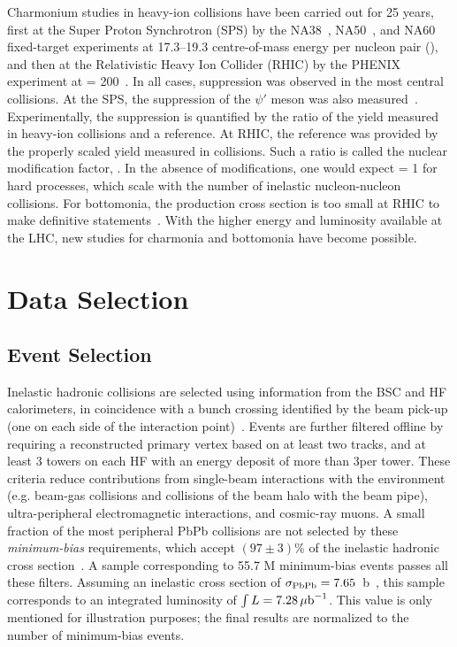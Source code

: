 Charmonium studies in heavy-ion collisions have been carried out for
25 years, first at the Super Proton Synchrotron (SPS) by the
NA38~\cite{Baglin:1994ui},
NA50~\cite{Alessandro:2004ap,Alessandro:2006ju}, and
NA60~\cite{Arnaldi:2007zz} fixed-target experiments at 17.3--19.3\GeV
centre-of-mass energy per nucleon pair (\sqrtsnn), and then at the
Relativistic Heavy Ion Collider (RHIC) by the PHENIX experiment at
\sqrtsnn = 200\GeV~\cite{Adare:2006ns}. In all cases, \Jpsi
suppression was observed in the most central collisions. At the SPS,
the suppression of the $\psi'$ meson was also
measured~\cite{Alessandro:2006ju}. Experimentally, the suppression is
quantified by the ratio of the yield measured in heavy-ion collisions
and a reference. At RHIC, the reference was provided by the properly
scaled yield measured in \pp collisions. Such a ratio is called the
nuclear modification factor, \raa. In the absence of modifications,
one would expect \raa = 1 for hard processes, which scale with the
number of inelastic nucleon-nucleon collisions. For bottomonia, the
production cross section is too small at RHIC to make definitive
statements~\cite{Abelev:2010am}. With the higher energy and luminosity
available at the LHC, new studies for charmonia and bottomonia have
become possible. 

\section{Data Selection}
\label{sec:data-selection}
\subsection{Event Selection}
\label{sec:event-sel}

Inelastic hadronic \PbPb collisions are selected using information
from the BSC and HF calorimeters, in coincidence with a bunch crossing
identified by the beam pick-up (one on each side of the interaction
point)~\cite{Adolphi:2008zzk}.  Events are further filtered offline by
requiring a reconstructed primary vertex based on at least two tracks,
and at least 3 towers on each HF with an energy deposit of more than
3\GeV per tower. These criteria reduce contributions from single-beam
interactions with the environment (e.g. beam-gas collisions and
collisions of the beam halo with the beam pipe), ultra-peripheral
electromagnetic interactions, and cosmic-ray muons. A small fraction
of the most peripheral PbPb collisions are not selected by these
\emph{minimum-bias} requirements, which accept $(97\pm3)$\% of the
inelastic hadronic cross section~\cite{Chatrchyan:2011sx}. A sample
corresponding to 55.7 M minimum-bias events passes all these
filters. Assuming an inelastic \PbPb cross section of $\sigma_{\text{PbPb}}
= 7.65$~b~\cite{Chatrchyan:2011sx}, this sample corresponds to an
integrated luminosity of $\int L = 7.28\mbox{\ensuremath{\,\mu\text{b}^\text{$-$1}}}$. This
value is only mentioned for illustration purposes; the final results
are normalized to the number of minimum-bias events.


